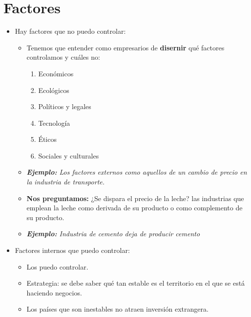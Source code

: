 \section{Factores}
\begin{itemize}
    \item Hay factores que no puedo controlar:
        \begin{itemize}
            \item Tenemos que entender como empresarios de \textbf{disernir} qué factores controlamos y cuáles no:
                \begin{enumerate}
                    \item Económicos 
                    \item Ecológicos 
                    \item Políticos y legales 
                    \item Tecnología
                    \item Éticos 
                    \item Sociales y culturales 
                \end{enumerate}
            
            \item \emph{\textbf{Ejemplo: }Los factores externos como aquellos de un cambio de precio en la industria de transporte.}
            \item \textbf{Nos preguntamos:} ¿Se dispara el precio de la leche? las industrias que emplean la leche como derivada de su producto o como complemento de su producto.
            \item \emph{\textbf{Ejemplo: }Industria de cemento deja de producir cemento} 
        \end{itemize}
    
    \item Factores internos que puedo controlar: 
        \begin{itemize}
            \item Los puedo controlar.
            \item Estrategia: se debe saber qué tan estable es el territorio en el que se está haciendo negocios.
            \item Los países que son inestables no atraen inversión extrangera.
        \end{itemize}
\end{itemize}

